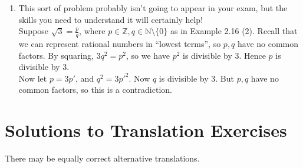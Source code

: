 \documentclass[10pt,a4paper]{article}
\begin{document}
\begin{enumerate}
    \item This sort of problem probably isn't going to appear in your exam, but the skills you need to understand it will certainly help! \\
    Suppose \( \sqrt{3} = \frac{p}{q} \), where \(p \in \mathbb{Z}, q \in \mathbb{N} \setminus \{0\} \) as in Example 2.16 (2). Recall that we can represent rational numbers in ``lowest terms'', so \(p, q\) have no common factors. By squaring, \( 3 q^2 = p^2 \), so we have \( p^2 \) is divisible by 3. Hence \(p\) is divisible by 3. \\
    Now let \( p = 3p' \), and \( q^2 = 3p'^2 \). Now \(q\) is divisible by 3. But \(p,q\) have no common factors, so this is a contradiction.
\end{enumerate}


\section{Solutions to Translation Exercises}
There may be equally correct alternative translations.
\end{document}
